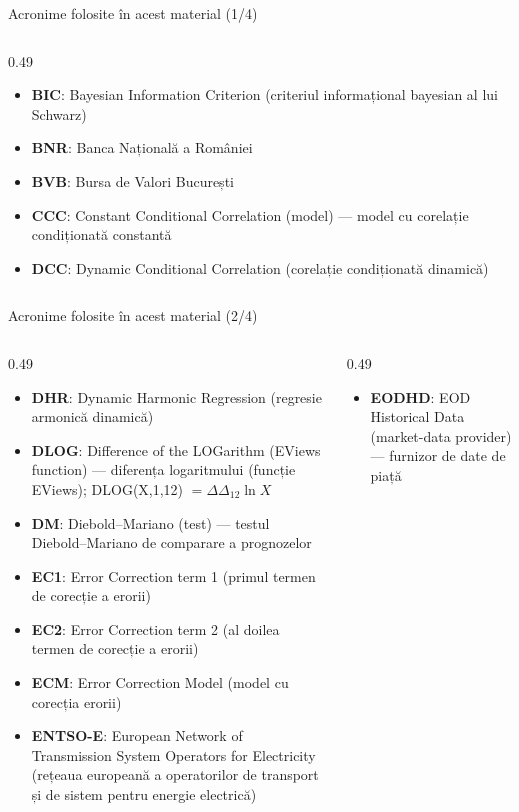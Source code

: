 \begin{frame}{Acronime folosite în acest material (1/4)}
\begin{columns}[T]
\begin{column}{0.49\textwidth}
\begin{itemize}
    \item \textbf{BIC}: Bayesian Information Criterion (criteriul informațional bayesian al lui Schwarz)
    \item \textbf{BNR}: Banca Națională a României
    \item \textbf{BVB}: Bursa de Valori București
    \item \textbf{CCC}: Constant Conditional Correlation (model) — model cu corelație condiționată constantă
    \item \textbf{DCC}: Dynamic Conditional Correlation (corelație condiționată dinamică)
\end{itemize}
\end{column}
\end{columns}
\end{frame}
\begin{frame}{Acronime folosite în acest material (2/4)}
\begin{columns}[T]
\begin{column}{0.49\textwidth}
\begin{itemize}\setlength{\itemsep}{0pt}
    \item \textbf{DHR}: Dynamic Harmonic Regression (regresie armonică dinamică)
    \item \textbf{DLOG}: Difference of the LOGarithm (EViews function) — diferența logaritmului (funcție EViews); DLOG(X,1,12) $= \Delta\Delta_{12}\ln X$
    \item \textbf{DM}: Diebold–Mariano (test) — testul Diebold–Mariano de comparare a prognozelor
    \item \textbf{EC1}: Error Correction term 1 (primul termen de corecție a erorii)
    \item \textbf{EC2}: Error Correction term 2 (al doilea termen de corecție a erorii)
    \item \textbf{ECM}: Error Correction Model (model cu corecția erorii)
    \item \textbf{ENTSO-E}: European Network of Transmission System Operators for Electricity (rețeaua europeană a operatorilor de transport și de sistem pentru energie electrică)
\end{itemize}
\end{column}
\begin{column}{0.49\textwidth}
\begin{itemize}\setlength{\itemsep}{0pt}
    \item \textbf{EODHD}: EOD Historical Data (market-data provider) — furnizor de date de piață

\end{itemize}
\end{column}
\end{columns}
\end{frame}
